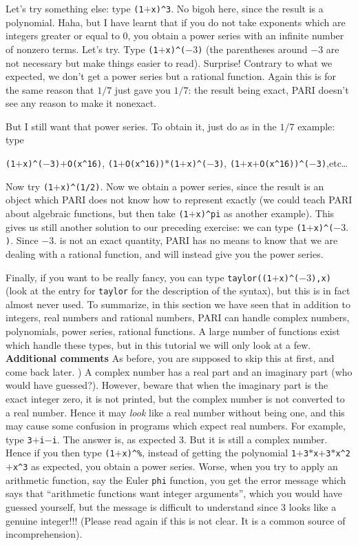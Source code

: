 Let's try something else: type {\tt (1$+$x)\^{}3}. No bigoh here, since the result is a polynomial.
Haha, but I have learnt that if you do not take exponents which are integers greater or equal
to 0, you obtain a power series with an infinite number of nonzero terms. Let's try.
Type {\tt (1$+$x)\^{}($-3$)} (the parentheses around $-3$ are not necessary but make things 
easier to read). Surprise! Contrary to what we expected, we don't get a power series but a
rational function. Again this is for the same reason that $1/7$ just gave you $1/7$: the result
being exact, PARI doesn't see any reason to make it nonexact.

But I still want that power series. To obtain it, just do as in the $1/7$ 
example: type 

{\tt (1$+$x)\^{}($-$3)$+$O(x\^{}{16})}, {\tt (1$+$O(x\^{}{16}))$*$(1$+$x)\^{}($-$3)},
{\tt (1$+$x$+$O(x\^{}{16}))\^{}($-$3)},etc\dots

Now try {\tt (1$+$x)\^{}(1/2)}. Now we obtain a power series, since the result is an object
which PARI does not know how to represent exactly (we could teach PARI about algebraic functions,
but then take {\tt (1$+$x)\^{}pi} as another example). This gives us still another solution to
our preceding exercise: we can type {\tt (1$+$x)\^{}($-3.$)}. Since $-3.$ is not an exact
quantity, PARI has no means to know that we are dealing with a rational function, and
will instead give you the power series.

Finally, if you want to be really fancy, you can type {\tt taylor((1$+$x)\^{}($-3$),x)}
(look at the entry for {\tt taylor} for the description of the syntax), but this is in fact
almost never used.
\smallskip
To summarize, in this section we have seen that in addition to integers,
real numbers and rational numbers, PARI can handle complex numbers,
polynomials, power series, rational functions. A large number of functions 
exist which handle these types, but in this tutorial we will only look at
a few. \medskip
{\bf Additional comments}
\medskip
As before, you are supposed to skip this at first, and come back later.
) A complex number has a real part and an imaginary part (who would have guessed?).
However, beware that when the imaginary part is the exact integer zero, it is not printed,
but the complex number is not converted to a real number. Hence it may {\sl look\/} like
a real number without being one, and this may cause some confusion in programs which expect
real numbers. For example, type {\tt 3$+$i$-$i}. The answer is, as expected 3. But it is still
a complex number. Hence if you then type {\tt (1$+$x)\^{}\%}, instead of getting the polynomial
{\tt 1$+$3$*$x$+$3$*$x\^{}2$+$x\^{}3} as expected, you obtain a power series. Worse, when you try to
apply an arithmetic function, say the Euler {\tt phi} function, you get the error message
which says that ``arithmetic functions want integer arguments'', which you would have
guessed yourself, but the message is difficult to understand since 3 looks like a genuine
integer!!! (Please read again if this is not clear. It is a common source of incomprehension).

